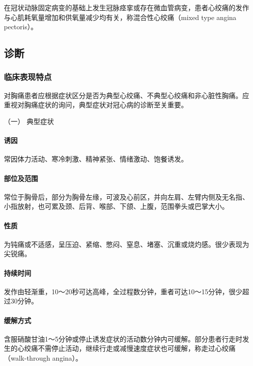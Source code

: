 在冠状动脉固定病变的基础上发生冠脉痉挛或存在微血管病变，患者心绞痛的发作与心肌耗氧量增加和供氧量减少均有关，称混合性心绞痛（mixed
type angina pectoris）。

\subsection{诊断}

\subsubsection{临床表现特点}

对胸痛患者应根据症状区分是否为典型心绞痛、不典型心绞痛和非心脏性胸痛。应重视对胸痛症状的询问，典型症状对冠心病的诊断至关重要。

\hypertarget{text00309.htmlux5cux23CHP10-7-2-1-1}{}
（一） 典型症状

\paragraph{诱因}

常因体力活动、寒冷刺激、精神紧张、情绪激动、饱餐诱发。

\paragraph{部位及范围}

常位于胸骨后，部分为胸骨左缘，可波及心前区，并向左肩、左臂内侧及无名指、小指放射，也可累及颈、后背、喉部、下颌、上腹，范围拳头或巴掌大小。

\paragraph{性质}

为钝痛或不适感，呈压迫、紧缩、憋闷、窒息、堵塞、沉重或烧灼感。很少表现为尖锐痛。

\paragraph{持续时间}

发作由轻渐重，10～20秒可达高峰，全过程数分钟，重者可达10～15分钟，很少超过30分钟。

\paragraph{缓解方式}

含服硝酸甘油1～5分钟或停止诱发症状的活动数分钟内可缓解。部分患者行走时发生的心绞痛不需停止活动，继续行走或减慢速度症状也可缓解，称走过心绞痛（walk-through
angina）。

